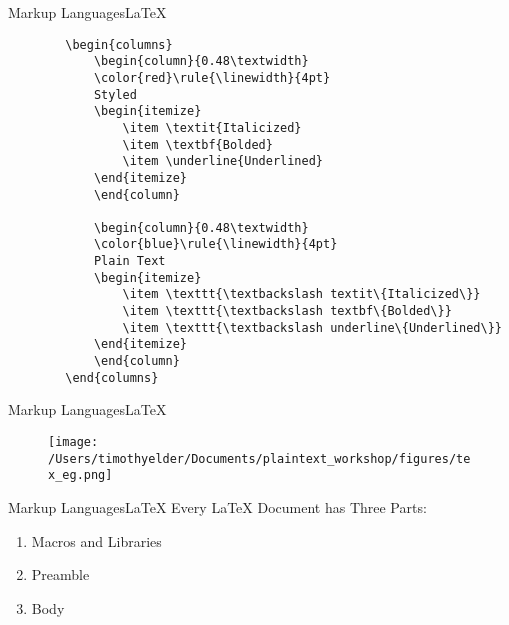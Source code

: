 \documentclass{beamer}
\begin{document}
\begin{frame}[fragile]{Markup Languages}{\LaTeX}
    \begin{scriptsize}
    \begin{lstlisting}
        \begin{columns}
            \begin{column}{0.48\textwidth}
            \color{red}\rule{\linewidth}{4pt}
            Styled
            \begin{itemize}
                \item \textit{Italicized}
                \item \textbf{Bolded}
                \item \underline{Underlined}
            \end{itemize}
            \end{column}
            
            \begin{column}{0.48\textwidth}
            \color{blue}\rule{\linewidth}{4pt}
            Plain Text
            \begin{itemize}
                \item \texttt{\textbackslash textit\{Italicized\}}
                \item \texttt{\textbackslash textbf\{Bolded\}} 
                \item \texttt{\textbackslash underline\{Underlined\}}
            \end{itemize}
            \end{column}
        \end{columns}
\end{lstlisting}
\end{scriptsize}
\end{frame}

\begin{frame}{Markup Languages}{\LaTeX}
    \begin{figure}
    \texttt{[image: /Users/timothyelder/Documents/plaintext\_workshop/figures/tex\_eg.png]}
    \end{figure}
\end{frame}

\begin{frame}{Markup Languages}{\LaTeX}
    Every LaTeX Document has Three Parts:
    \begin{enumerate}
        \item Macros and Libraries
        \item Preamble
        \item Body
    \end{enumerate}
\end{frame}
\end{document}
